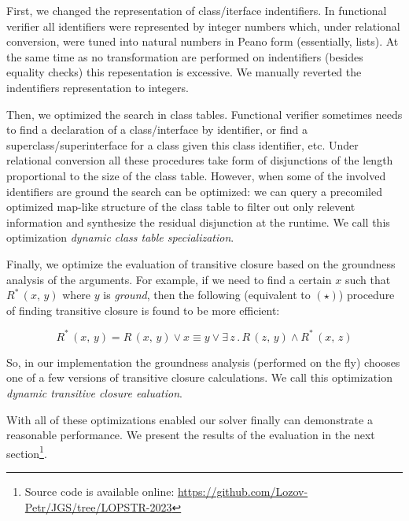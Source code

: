First, we changed the representation of class/iterface indentifiers. In functional verifier all identifiers were represented by integer numbers which,
under relational conversion, were tuned into natural numbers in Peano form (essentially, lists). At the same time as no transformation are
performed on indentifiers (besides equality checks) this repesentation is excessive. We manually reverted the indentifiers representation to
integers.

Then, we optimized the search in class tables. Functional verifier sometimes needs to find a declaration of a class/interface by identifier, or
find a superclass/superinterface for a class given this class identifier, etc. Under relational conversion all these procedures
take form of disjunctions of the length proportional to the size of the class table. However, when some of the involved identifiers
are ground the search can be optimized: we can query a precomiled optimized map-like structure of the class table to filter out
only relevent information and synthesize the residual disjunction at the runtime. We call this optimization \emph{dynamic class table specialization}.

Finally, we optimize the evaluation of transitive closure based on the groundness analysis of the arguments. For example, if we need to find a certain
$x$ such that $R^*\,(x,\,y)$ where $y$ is \emph{ground}, then the following (equivalent to $(\star)$) procedure of finding transitive closure is
found to be more efficient:

\[
R^*\,(x,\, y) = R\, (x,\, y)\vee x\equiv y\vee\exists\, z\,.\,R\,(z,\,y)\wedge R^*\,(x,\,z)
\]

So, in our implementation the groundness analysis (performed on the fly) chooses one of a few versions of transitive closure calculations.
We call this optimization \emph{dynamic transitive closure ealuation}.

With all of these optimizations enabled our solver finally can demonstrate a reasonable performance. We present the results of the evaluation
in the next section\footnote{Source code is available online: \url{https://github.com/Lozov-Petr/JGS/tree/LOPSTR-2023}}. 
